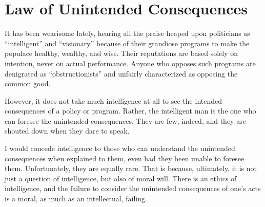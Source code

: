 \section{Law of Unintended Consequences}

It has been wearisome lately, hearing all the praise heaped upon politicians as ``intelligent'' and ``visionary'' because of their grandiose programs to make the populace healthy, wealthy, and wise. Their reputations are based solely on intention, never on actual performance. Anyone who opposes such programs are denigrated as ``obstructionists'' and unfairly characterized as opposing the common good.

However, it does not take much intelligence at all to see the intended consequences of a policy or program. Rather, the intelligent man is the one who can foresee the unintended consequences. They are few, indeed, and they are shouted down when they dare to speak.

I would concede intelligence to those who can understand the unintended consequences when explained to them, even had they been unable to foresee them. Unfortunately, they are equally rare. That is because, ultimately, it is not just a question of intelligence, but also of moral will. There is an ethics of intelligence, and the failure to consider the unintended consequences of one's acts is a moral, as much as an intellectual, failing.



